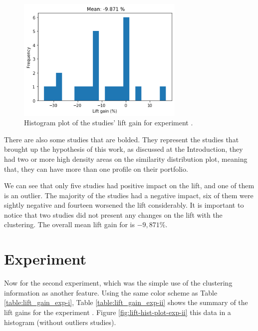 \begin{figure}[!ht]
   \centering
   \includegraphics[width=8cm]{fig/ch4-lift-hist-plot-exp-i.png}
   \caption{Histogram plot of the studies' lift gain for experiment \nameExperimentI{}.}
   \label{fig:lift-hist-plot-exp-i}
\end{figure}

There are also some studies that are bolded. They represent the studies that brought up the hypothesis of this work, as discussed at the Introduction, they had two or more high density areas on the similarity distribution plot, meaning that, they can have more than one profile on their portfolio.

We can see that only five studies had positive impact on the lift, and one of them is an outlier. The majority of the studies had a negative impact, six of them were sightly negative and fourteen worsened the lift considerably. It is important to notice that two studies did not present any changes on the lift with the clustering. The overall mean lift gain for \nameExperimentI{} is $-9,871 \%$.


\section{Experiment \nameExperimentII{}}

Now for the second experiment, which was the simple use of the clustering information as another feature. Using the same color scheme as Table \ref{table:lift_gain_exp-i}, Table \ref{table:lift_gain_exp-ii} shows the summary of the lift gains for the experiment \nameExperimentII{}. Figure \ref{fig:lift-hist-plot-exp-ii} this data in a histogram (without outliers studies).

